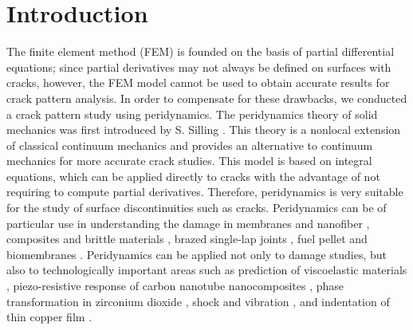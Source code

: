 \section{Introduction}
\label{sec:1}
The finite element method (FEM) is
founded on the basis of partial differential equations;
since partial derivatives may not always be defined on surfaces with cracks, however,
the FEM model cannot be used to obtain accurate results for crack pattern analysis.
In order to compensate for these drawbacks, we conducted a crack pattern study using peridynamics.
The peridynamics theory of solid mechanics was first introduced by S. Silling \cite{Ref1,Ref2,Ref3,Ref4}.
This theory is a nonlocal extension of classical continuum mechanics and provides an alternative to continuum mechanics for more accurate crack studies.
This model is based on integral equations, which can be applied directly to cracks with the advantage of not requiring to compute partial derivatives.
Therefore, peridynamics is very suitable for the study of surface discontinuities such as cracks.
Peridynamics can be of particular use in understanding the damage in membranes and nanofiber \cite{Ref5}, composites and brittle materials \cite{Ref6}, brazed single-lap joints \cite{Ref7}, fuel pellet \cite{Ref8} and biomembranes \cite{Ref9}.
Peridynamics can be applied not only to damage studies, but also to technologically important areas such as prediction of viscoelastic materials \cite{Ref10}, piezo-resistive response of carbon nanotube nanocomposites \cite{Ref11}, phase transformation in zirconium dioxide \cite{Ref12}, shock and vibration \cite{Ref13}, and indentation of thin copper film \cite{Ref14}.


